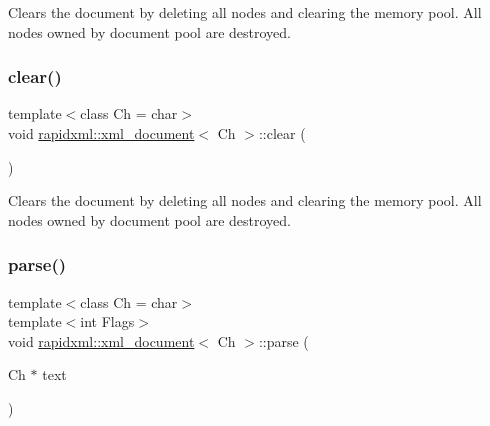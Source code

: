 Clears the document by deleting all nodes and clearing the memory pool. All nodes owned by document pool are destroyed. \mbox{\label{classrapidxml_1_1xml__document_a826929ff54242532198701f19ff5f83f}} 
\subsubsection{\texorpdfstring{clear()}{clear()}\hspace{0.1cm}{\footnotesize\ttfamily [2/2]}}
{\footnotesize\ttfamily template$<$class Ch  = char$>$ \\
void \mbox{\hyperlink{classrapidxml_1_1xml__document}{rapidxml\+::xml\+\_\+document}}$<$ Ch $>$\+::clear (\begin{DoxyParamCaption}{ }\end{DoxyParamCaption})\hspace{0.3cm}{\ttfamily [inline]}}

Clears the document by deleting all nodes and clearing the memory pool. All nodes owned by document pool are destroyed. \mbox{\label{classrapidxml_1_1xml__document_ac6e73ff9ac323bf5a370c38feb03a6b1}} 
\subsubsection{\texorpdfstring{parse()}{parse()}\hspace{0.1cm}{\footnotesize\ttfamily [1/2]}}
{\footnotesize\ttfamily template$<$class Ch  = char$>$ \\
template$<$int Flags$>$ \\
void \mbox{\hyperlink{classrapidxml_1_1xml__document}{rapidxml\+::xml\+\_\+document}}$<$ Ch $>$\+::parse (\begin{DoxyParamCaption}\item[{Ch $\ast$}]{text }\end{DoxyParamCaption})\hspace{0.3cm}{\ttfamily [inline]}}


